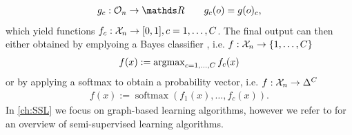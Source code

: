 %
\begin{align*}
g_c:\conset_n\to\R\qquad g_c(o) = g(o)_c,
\end{align*}
%
which yield functions $f_c:\mathcal{X}_n\to[0,1],c=1,\ldots,C$. The final output can then either obtained by emplyoing a Bayes classifier \cite{devroye2013probabilistic}, i.e. $f:\mathcal{X}_n\to\{1,\ldots, C\}$ 
%
\begin{align*}
f(x) := \operatorname{argmax}_{c=1,\ldots, C} f_c(x)
\end{align*}
%
or by applying a softmax to obtain a probability vector, i.e. $f:\mathcal{X}_n\to\Delta^C$ 
%
\begin{align*}
f(x) := \operatorname{soft max}\left(f_1(x), \ldots, f_c(x)\right).
\end{align*}
%
In \cref{ch:SSL} we focus on graph-based learning algorithms, however we refer to \cite{zhu2005semi} for an overview of semi-supervised learning algorithms. 
